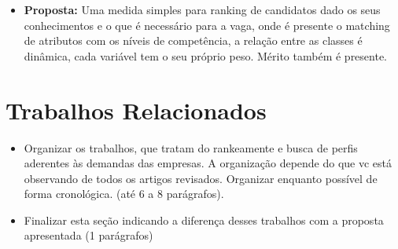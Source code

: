 \documentclass[preprint,12pt]{elsarticle}
\begin{document}
\begin{itemize}
\begin{itemize}
  \end{itemize}
  
\item \textbf{Proposta:} Uma medida simples para ranking de candidatos dado os seus conhecimentos e o que é necessário para a vaga, onde é presente o matching de atributos com os níveis de competência, a relação entre as classes é dinâmica, cada variável tem o seu próprio peso. Mérito também é presente.
\end{itemize}




\section{Trabalhos Relacionados}
\label{sec:sample2}

\begin{itemize}
\color{blue}
\item Organizar os trabalhos, que tratam do rankeamente e busca de perfis aderentes às demandas das empresas. A organização depende do que vc está observando de todos os artigos revisados. Organizar enquanto possível de forma cronológica. (até 6 a 8 parágrafos).  
\item Finalizar esta seção indicando a diferença desses trabalhos com a proposta apresentada (1 parágrafos)
\end{itemize}
\end{document}

